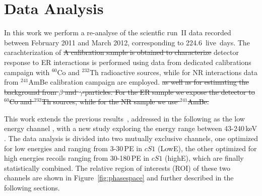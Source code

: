 \section{Data Analysis}
\label{sec:Analysis}
In this work we perform a re-analyse of the scientfic run~II data recorded between February 2011 and March 2012, 
corresponding to 224.6~live~days. The carachterization of \sout{A calibration sample is obtained to characterize} detector response to ER interactions
is performed using data from dedicated calibrations campaign with $^{60}$Co and $^{232}$Th radioactive sources, while for NR interactions data from $^{241}$AmBe calibration campaign are employed.
\sout{as well as for estimating the background from $\beta$ and $\gamma$-particles. For the ER sample we expose the detector to $^{60}$Co and $^{232}$Th sources, while for the NR sample we use $^{241}$AmBe.}


This work extends the previous results~\cite{xe100_run10_si,xe100_run_combination}, addressed in the following as the low energy channel , with a new study exploring the energy range between 43-240\,keV . 
The data analysis is divided into two mutually exclusive channels, one optimized for low energies and ranging from 3-30\,PE in $cS1$ (LowE), the other optimized for high energies recoils
ranging from 30-180\,PE in $cS1$ (highE), which are finally statistically combined. 
The relative region of interests (ROI) of these two channels are shown in Figure~\ref{fig:phasespace} and further described in the following sections. 



